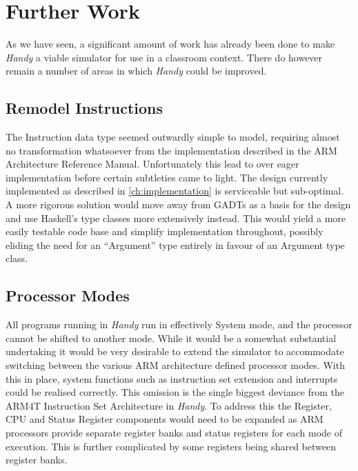 
\chapter{Further Work} %

\label{ch:furtherwork} %

As we have seen, a significant amount of work has already been done to make \emph{Handy} a viable simulator for use in a classroom context. There do however remain a number of areas in which \emph{Handy} could be improved.


\section{Remodel Instructions}

The Instruction data type seemed outwardly simple to model, requiring almost no transformation whatsoever from the implementation described in the ARM Architecture Reference Manual.  Unfortunately this lead to over eager implementation before certain subtleties came to light. The design currently implemented as described in \autoref{ch:implementation} is serviceable but sub-optimal. A more rigorous solution would move away from GADTs as a basis for the design and use Haskell's type classes more extensively instead. This would yield a more easily testable code base and simplify implementation throughout, possibly eliding the need for an ``Argument'' type entirely in favour of an Argument type class.


\section{Processor Modes}

All programs running in \emph{Handy} run in effectively System mode, and the processor cannot be shifted to another mode. While it would be a somewhat substantial undertaking it would be very desirable to extend the simulator to accommodate switching between the various ARM architecture defined processor modes. With this in place, system functions such as instruction set extension and interrupts could be realised correctly. This omission is the single biggest deviance from the ARM4T Instruction Set Architecture in \emph{Handy}. To address this the Register, CPU and Status Register components would need to be expanded as ARM processors provide separate register banks and status registers for each mode of execution. This is further complicated by some registers being shared between register banks.

